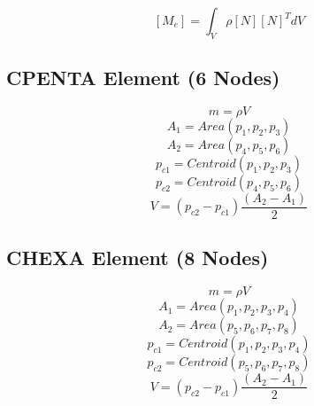       \[ [M_e] = \int_V{\rho [N][N]^T dV} \]

   \subsection{CPENTA Element (6 Nodes)}
     \[ m = \rho V \]
     \[ A_1 = Area(p_1, p_2, p_3) \]
     \[ A_2 = Area(p_4, p_5, p_6) \]
     \[ p_{c1} = Centroid(p_1, p_2 ,p_3) \]
     \[ p_{c2} = Centroid(p_4, p_5 ,p_6) \]
     \[ V = (p_{c2}-p_{c1}) \frac{(A_2 - A_1)}{2} \]

   \subsection{CHEXA Element (8 Nodes)}
     \[ m = \rho V \]
     \[ A_1 = Area(p_1, p_2, p_3, p_4) \]
     \[ A_2 = Area(p_5, p_6, p_7, p_8) \]
     \[ p_{c1} = Centroid(p_1, p_2 ,p_3, p_4) \]
     \[ p_{c2} = Centroid(p_5, p_6 ,p_7, p_8) \]
     \[ V = (p_{c2}-p_{c1}) \frac{(A_2 - A_1)}{2} \]

